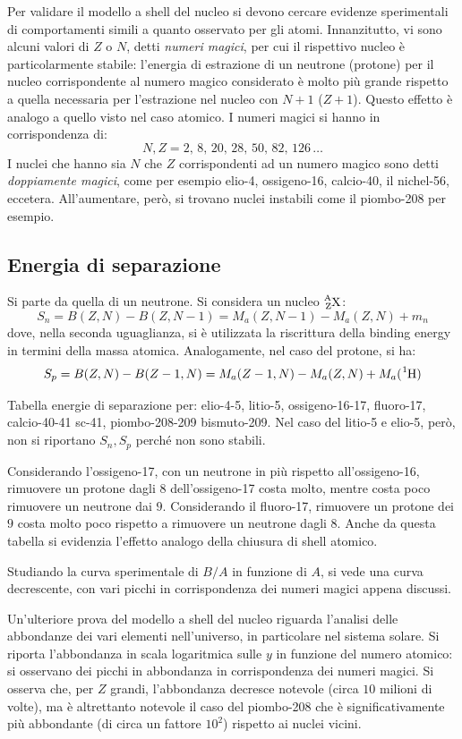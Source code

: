 \documentclass[11pt, a4paper]{scrartcl}
\theoremstyle{style}
\newenvironment{boxenv}[1][]{
    \begin{eqbox}[#1]
    }{
   \end{eqbox}
}
\numberwithin{equation}{subsection}
\begin{document}
Per validare il modello a shell del nucleo si devono cercare evidenze sperimentali di comportamenti simili a quanto osservato per gli atomi.
Innanzitutto, vi sono alcuni valori di $Z$ o $N$, detti \textit{numeri magici}, per cui il rispettivo nucleo \`e particolarmente stabile: l'energia di estrazione di un neutrone (protone) per il nucleo corrispondente al numero magico considerato \`e molto pi\`u grande rispetto a quella necessaria per l'estrazione nel nucleo con $N+1$ ($Z+1$).
Questo effetto \`e analogo a quello visto nel caso atomico.
I numeri magici si hanno in corrispondenza di:
\[
N,Z = 2,\,8,\,20,\,28,\,50,\,82,\,126\, \ldots
\] 
I nuclei che hanno sia $N$ che $Z$ corrispondenti ad un numero magico sono detti \textit{doppiamente magici}, come per esempio elio-4, ossigeno-16, calcio-40, il nichel-56, eccetera.
All'aumentare, per\`o, si trovano nuclei instabili come il piombo-208 per esempio.

\subsection{Energia di separazione}
Si parte da quella di un neutrone. 
Si considera un nucleo $\ce{^{A}_ZX}$:
\[
S_n = B(Z,N) - B(Z,N-1) = M_a(Z,N-1) - M_a(Z,N) + m_n
\] 
dove, nella seconda uguaglianza, si \`e utilizzata la riscrittura della binding energy in termini della massa atomica.
Analogamente, nel caso del protone, si ha:
\[
	S_p = B(Z,N) - B(Z-1,N) = M_a(Z-1,N) - M_a(Z,N) + M_a(\ce{^{1}H})
\] 
\begin{boxenv}[]
Tabella energie di separazione per: elio-4-5, litio-5, ossigeno-16-17, fluoro-17, calcio-40-41 sc-41, piombo-208-209 bismuto-209.
Nel caso del litio-5 e elio-5, per\`o, non si riportano $S_n, S_p$ perch\'e non sono stabili.
\end{boxenv}
\noindent Considerando l'ossigeno-17, con un neutrone in pi\`u rispetto all'ossigeno-16, rimuovere un protone dagli $8$ dell'ossigeno-17 costa molto, mentre costa poco rimuovere un neutrone dai $9$.
Considerando il fluoro-17, rimuovere un protone dei $9$ costa molto poco rispetto a rimuovere un neutrone dagli $8$.
Anche da questa tabella si evidenzia l'effetto analogo della chiusura di shell atomico.

Studiando la curva sperimentale di $B / A$ in funzione di $A$, si vede una curva decrescente, con vari picchi in corrispondenza dei numeri magici appena discussi.

Un'ulteriore prova del modello a shell del nucleo riguarda l'analisi delle abbondanze dei vari elementi nell'universo, in particolare nel sistema solare.
Si riporta l'abbondanza in scala logaritmica sulle $y$ in funzione del numero atomico: si osservano dei picchi in abbondanza in corrispondenza dei numeri magici.
Si osserva che, per $Z$ grandi, l'abbondanza decresce notevole (circa $10$ milioni di volte), ma \`e altrettanto notevole il caso del piombo-208 che \`e significativamente pi\`u abbondante (di circa un fattore $10^2$) rispetto ai nuclei vicini.
\end{document}
